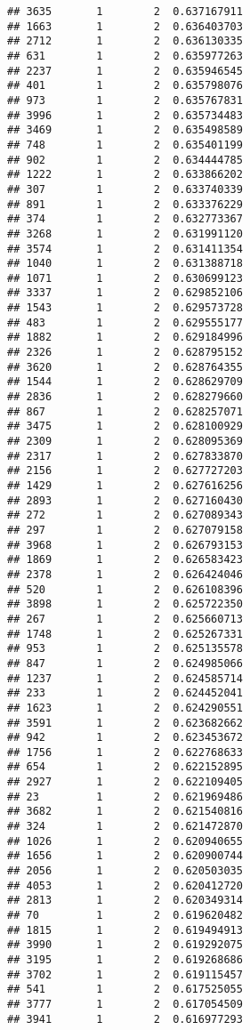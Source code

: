 \documentclass[
]{article}
\begin{document}
\begin{verbatim}
## 3635       1        2  0.637167911
## 1663       1        2  0.636403703
## 2712       1        2  0.636130335
## 631        1        2  0.635977263
## 2237       1        2  0.635946545
## 401        1        2  0.635798076
## 973        1        2  0.635767831
## 3996       1        2  0.635734483
## 3469       1        2  0.635498589
## 748        1        2  0.635401199
## 902        1        2  0.634444785
## 1222       1        2  0.633866202
## 307        1        2  0.633740339
## 891        1        2  0.633376229
## 374        1        2  0.632773367
## 3268       1        2  0.631991120
## 3574       1        2  0.631411354
## 1040       1        2  0.631388718
## 1071       1        2  0.630699123
## 3337       1        2  0.629852106
## 1543       1        2  0.629573728
## 483        1        2  0.629555177
## 1882       1        2  0.629184996
## 2326       1        2  0.628795152
## 3620       1        2  0.628764355
## 1544       1        2  0.628629709
## 2836       1        2  0.628279660
## 867        1        2  0.628257071
## 3475       1        2  0.628100929
## 2309       1        2  0.628095369
## 2317       1        2  0.627833870
## 2156       1        2  0.627727203
## 1429       1        2  0.627616256
## 2893       1        2  0.627160430
## 272        1        2  0.627089343
## 297        1        2  0.627079158
## 3968       1        2  0.626793153
## 1869       1        2  0.626583423
## 2378       1        2  0.626424046
## 520        1        2  0.626108396
## 3898       1        2  0.625722350
## 267        1        2  0.625660713
## 1748       1        2  0.625267331
## 953        1        2  0.625135578
## 847        1        2  0.624985066
## 1237       1        2  0.624585714
## 233        1        2  0.624452041
## 1623       1        2  0.624290551
## 3591       1        2  0.623682662
## 942        1        2  0.623453672
## 1756       1        2  0.622768633
## 654        1        2  0.622152895
## 2927       1        2  0.622109405
## 23         1        2  0.621969486
## 3682       1        2  0.621540816
## 324        1        2  0.621472870
## 1026       1        2  0.620940655
## 1656       1        2  0.620900744
## 2056       1        2  0.620503035
## 4053       1        2  0.620412720
## 2813       1        2  0.620349314
## 70         1        2  0.619620482
## 1815       1        2  0.619494913
## 3990       1        2  0.619292075
## 3195       1        2  0.619268686
## 3702       1        2  0.619115457
## 541        1        2  0.617525055
## 3777       1        2  0.617054509
## 3941       1        2  0.616977293

\end{verbatim}
\end{document}
